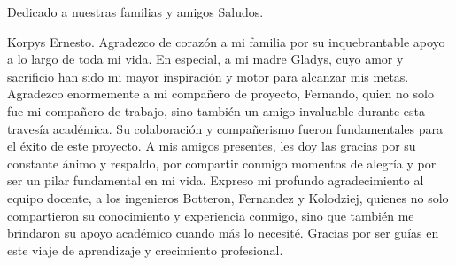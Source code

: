 

\begin{reconocimiento}{Dedicado a nuestras familias y amigos Saludos.}

Korpys Ernesto.
Agradezco de corazón a mi familia por su inquebrantable apoyo a lo largo de toda mi vida. En especial, a mi madre Gladys, cuyo amor y sacrificio han sido mi mayor inspiración y motor para alcanzar mis metas.
Agradezco enormemente a mi compañero de proyecto, Fernando, quien no solo fue mi compañero de trabajo, sino también un amigo invaluable durante esta travesía académica. Su colaboración y compañerismo fueron fundamentales para el éxito de este proyecto.
A mis amigos presentes, les doy las gracias por su constante ánimo y respaldo, por compartir conmigo momentos de alegría y por ser un pilar fundamental en mi vida.
Expreso mi profundo agradecimiento al equipo docente, a los ingenieros Botteron, Fernandez y Kolodziej, quienes no solo compartieron su conocimiento y experiencia conmigo, sino que también me brindaron su apoyo académico cuando más lo necesité. Gracias por ser guías en este viaje de aprendizaje y crecimiento profesional.


\end{reconocimiento}